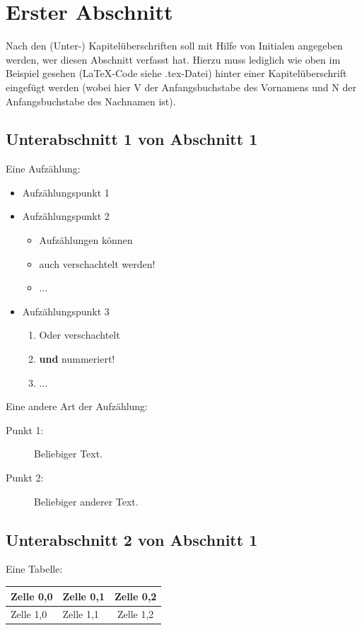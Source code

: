 
\section{Erster Abschnitt }
Nach den (Unter-) Kapitelüberschriften soll mit Hilfe von Initialen angegeben werden, wer diesen Abschnitt verfasst hat. Hierzu muss lediglich wie oben im Beispiel gesehen  (LaTeX-Code siehe .tex-Datei) hinter einer Kapitelüberschrift eingefügt werden (wobei hier V der Anfangsbuchstabe des Vornamens und N der Anfangsbuchstabe des Nachnamen ist). 
\subsection{Unterabschnitt 1 von Abschnitt 1 }
Eine Aufzählung:
\begin{itemize}
    \item Aufzählungspunkt 1
    \item Aufzählungspunkt 2
	\begin{itemize}
	    \item Aufzählungen können 
	    \item auch verschachtelt werden!
	    \item ...
	\end{itemize}    
    \item Aufzählungspunkt 3
	\begin{enumerate}
	    \item Oder verschachtelt
	    \item \textbf{und} nummeriert!
	    \item ...
	\end{enumerate}
\end{itemize}
Eine andere Art der Aufzählung:
\begin{description}
    \item[Punkt 1: ] Beliebiger Text.
    \item[Punkt 2: ] Beliebiger anderer Text.
\end{description}

\subsection{Unterabschnitt 2 von Abschnitt 1 }
Eine Tabelle:
\par\medskip %
\begin{tabular}{|l|p{4cm}|c|} %
    \hline
    Zelle 0,0 & Zelle 0,1 & Zelle 0,2 \\ %
    \hline
    Zelle 1,0 & Zelle 1,1 & Zelle 1,2 \\
    \hline
\end{tabular}
\par\smallskip

